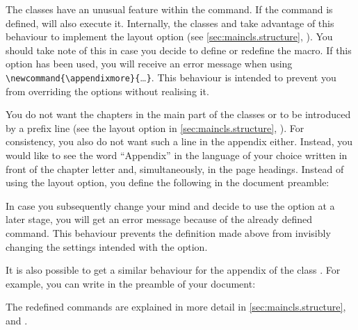 \begin{Declaration}
\end{Declaration}%
The \KOMAScript{} classes have an unusual feature within the
 command.  If the  command
is defined,  will also execute it. Internally,
the \KOMAScript{} classes  and  take advantage of this behaviour to
implement the  layout option (see
\autoref{sec:maincls.structure},
). You should
take note of this in case you decide to define or redefine the
 macro. If this option has been used, you will receive an
error message when using \verb|\newcommand{\appendixmore}{|\dots\verb|}|. This
behaviour is intended to prevent you from overriding the options without
realising it.

\begin{Example}
  You do not want the chapters in the main part of the classes 
  or  to be introduced by a prefix line (see the
   layout option in
  \autoref{sec:maincls.structure},
  ). For consistency, you also do
  not want such a line in the appendix either. Instead, you would like to see
  the word ``Appendix'' in the language of your choice written in front of the
  chapter letter and, simultaneously, in the page headings.  Instead of using
  the  layout option, you define the
  following in the document preamble:
%
\begin{lstcode}
  \newcommand*{\appendixmore}{%
    \renewcommand*{\chapterformat}{%
      \appendixname~\thechapter\autodot\enskip}
    \renewcommand*{\chaptermarkformat}{%
      \appendixname~\thechapter\autodot\enskip}
  }
\end{lstcode}
%
  In case you subsequently change your mind and decide to use the option
   at a later stage, you will get an
  error message because of the already defined  command.
  This behaviour prevents the definition made above from invisibly changing
  the settings intended with the option.

  It is also possible to get a similar behaviour for the appendix of the class
  . For example, you can write in the preamble of your
  document:
\begin{lstcode}[moretexcs={ifthenelse,equal}]
  \newcommand*{\appendixmore}{%
    \renewcommand*{\sectionformat}{%
      \appendixname~\thesection\autodot\enskip}%
    \renewcommand*{\sectionmarkformat}{%
      \appendixname~\thesection\autodot\enskip}}
\end{lstcode}

  The redefined commands are explained in more detail in
  \autoref{sec:maincls.structure},
   and
  .
\end{Example}
%
\EndIndexGroup



